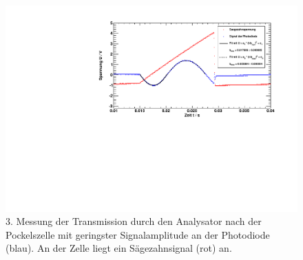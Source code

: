 \begin{figure}[H]
\begin{center}
  \includegraphics[width=15cm]{../img/pock_saege_winkel3.pdf}
  \caption{3. Messung der Transmission durch den Analysator nach der Pockelszelle mit geringster Signalamplitude
  an der Photodiode (blau). An der Zelle liegt ein Sägezahnsignal (rot) an.}
  \label{img:pock_saege_winkel3}
\end{center}
\end{figure}

